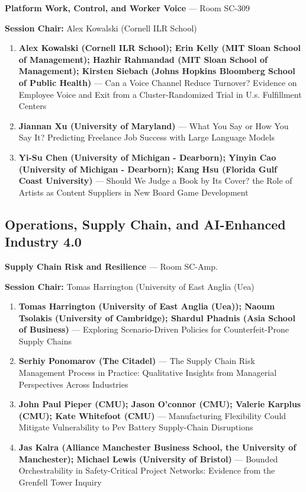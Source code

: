 \documentclass[
  10pt,
  letterpaper,
  DIV=11,
  numbers=noendperiod]{scrartcl}
\begin{document}
\textbf{Platform Work, Control, and Worker Voice} --- Room SC-309

\textbf{Session Chair:} Alex Kowalski (Cornell ILR School)

\begin{enumerate}
\def\labelenumi{\arabic{enumi}.}
\item
  \textbf{Alex Kowalski (Cornell ILR School); Erin Kelly (MIT Sloan
  School of Management); Hazhir Rahmandad (MIT Sloan School of
  Management); Kirsten Siebach (Johns Hopkins Bloomberg School of Public
  Health)} --- Can a Voice Channel Reduce Turnover? Evidence on Employee
  Voice and Exit from a Cluster-Randomized Trial in U.s. Fulfillment
  Centers
\item
  \textbf{Jiannan Xu (University of Maryland)} --- What You Say or How
  You Say It? Predicting Freelance Job Success with Large Language
  Models
\item
  \textbf{Yi-Su Chen (University of Michigan - Dearborn); Yinyin Cao
  (University of Michigan - Dearborn); Kang Hsu (Florida Gulf Coast
  University)} --- Should We Judge a Book by Its Cover? the Role of
  Artists as Content Suppliers in New Board Game Development
\end{enumerate}

\subsection{\texorpdfstring{\textcolor{operations}{Operations, Supply Chain, and AI-Enhanced Industry 4.0}}{}}\label{section-25}

\textbf{Supply Chain Risk and Resilience} --- Room SC-Amp.

\textbf{Session Chair:} Tomas Harrington (University of East Anglia
(Uea)

\begin{enumerate}
\def\labelenumi{\arabic{enumi}.}
\item
  \textbf{Tomas Harrington (University of East Anglia (Uea)); Naoum
  Tsolakis (University of Cambridge); Shardul Phadnis (Asia School of
  Business)} --- Exploring Scenario-Driven Policies for
  Counterfeit-Prone Supply Chains
\item
  \textbf{Serhiy Ponomarov (The Citadel)} --- The Supply Chain Risk
  Management Process in Practice: Qualitative Insights from Managerial
  Perspectives Across Industries
\item
  \textbf{John Paul Pieper (CMU); Jason O'connor (CMU); Valerie Karplus
  (CMU); Kate Whitefoot (CMU)} --- Manufacturing Flexibility Could
  Mitigate Vulnerability to Pev Battery Supply-Chain Disruptions
\item
  \textbf{Jas Kalra (Alliance Manchester Business School, the University
  of Manchester); Michael Lewis (University of Bristol)} --- Bounded
  Orchestrability in Safety-Critical Project Networks: Evidence from the
  Grenfell Tower Inquiry
\end{enumerate}
\end{document}
